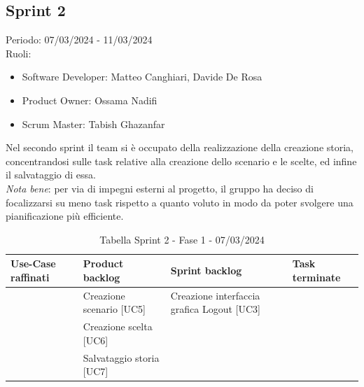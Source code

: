 \documentclass{article}
\begin{document}
\newpage
\subsection{Sprint 2}
Periodo: 07/03/2024 - 11/03/2024\vspace*{7pt}\\
Ruoli:
\begin{itemize}[label = { }]
    \itemsep0em
    \item Software Developer: Matteo Canghiari, Davide De Rosa
    \item Product Owner: Ossama Nadifi 
    \item Scrum Master: Tabish Ghazanfar
\end{itemize}
Nel secondo sprint il team si è occupato della realizzazione della creazione storia, concentrandosi sulle task relative alla creazione dello scenario e le scelte, ed infine il salvataggio di essa.\vspace*{7pt}\\
\textit{Nota bene}: per via di impegni esterni al progetto, il gruppo ha deciso di focalizzarsi su meno task rispetto a quanto voluto in modo da poter svolgere una pianificazione più efficiente.

\begin{table}[h]
    \centering
    \begin{tabularx}{\textwidth}{|X|X|X|X|}
        \hline
        \bf Use-Case raffinati & \bf Product backlog & \bf Sprint backlog & \bf Task terminate \\
        \hline
        & Creazione scenario [UC5] & Creazione interfaccia grafica Logout [UC3] & \\
        \hline
        & Creazione scelta [UC6] & & \\
        \hline
        & Salvataggio storia [UC7] & & \\
        \hline
    \end{tabularx}
    \caption*{Tabella Sprint 2 - Fase 1 - 07/03/2024}
\end{table}
\end{document}
